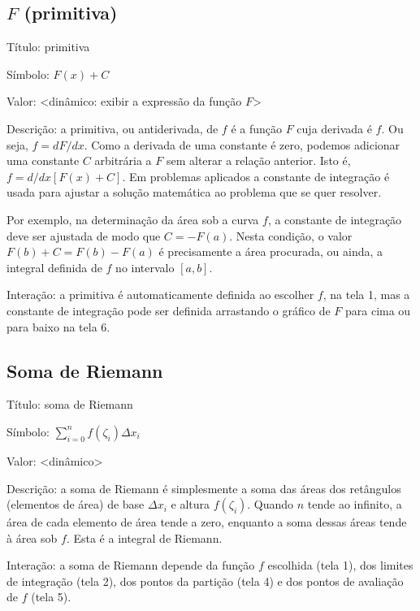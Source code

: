 \documentclass[a4paper,10pt]{scrartcl}
\begin{document}
  \subsection*{$F$ (primitiva)}
    \begin{compactdesc}
	\item{Título:} primitiva
	\item{Símbolo:} $F(x)+C$
	\item{Valor:} <dinâmico: exibir a expressão da função $F$>
	\item{Descrição:} a primitiva, ou antiderivada, de $f$ é a função $F$ cuja derivada é $f$. Ou seja, $f = dF/dx$. Como a derivada de uma constante é zero, podemos adicionar uma constante $C$ arbitrária a $F$ sem alterar a relação anterior. Isto é, $f = d/dx [F(x)+C]$. Em problemas aplicados a constante de integração é usada para ajustar a solução matemática ao problema que se quer resolver.
	
	Por exemplo, na determinação da área sob a curva $f$, a constante de integração deve ser ajustada de modo que $C = -F(a)$. Nesta condição, o valor $F(b)+C = F(b)-F(a)$ é precisamente a área procurada, ou ainda, a integral definida de $f$ no intervalo $[a,b]$.
	\item{Interação:} a primitiva é automaticamente definida ao escolher $f$, na tela 1, mas a constante de integração pode ser definida arrastando o gráfico de $F$ para cima ou para baixo na tela 6.
    \end{compactdesc}
    
  
    
  \subsection*{Soma de Riemann}
    \begin{compactdesc}
	\item{Título:} soma de Riemann
	\item{Símbolo:} $\sum_{i=0}^{n} f(\zeta_i) \Delta x_i$
	\item{Valor:} <dinâmico>
	\item{Descrição:} a soma de Riemann é simplesmente a soma das áreas dos retângulos (elementos de área) de base $\Delta x_i$ e altura $f(\zeta_i)$. Quando $n$ tende ao infinito, a área de cada elemento de área tende a zero, enquanto a soma dessas áreas tende à área sob $f$. Esta é a integral de Riemann.
	\item{Interação:} a soma de Riemann depende da função $f$ escolhida (tela 1), dos limites de integração (tela 2), dos pontos da partição (tela 4) e dos pontos de avaliação de $f$ (tela 5).
    \end{compactdesc}
	
\end{document}
